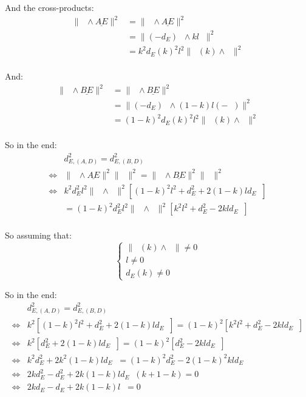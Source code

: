 \documentclass[10pt,a4paper]{article}
\newcommand{\ud}[1]{\underline{#1}}
\DeclareMathOperator{\cross}{\wedge}
\DeclareMathOperator{\AD}{\ud{AD}}
\DeclareMathOperator{\BD}{\ud{BD}}
\DeclareMathOperator{\ED}{\ud{ED}}
\DeclareMathOperator{\e}{\ud{e}}
\DeclareMathOperator{\n}{\ud{n}}
\DeclareMathOperator{\en}{\ud{e}\cdot\ud{n}}
\begin{document}
And the cross-products:
$$
\begin{array}{lll}
    \| \AD \cross \ud{AE} \|^2
    & = \| \ED \cross \ud{AE} \|^2\\
    & = \| (-d_E)\n \cross kl\e \|^2\\
    & = k^2d_E(k)^2l^2 \| \n(k) \cross \e \|^2\\
\end{array}
$$

And:
$$
\begin{array}{lll}
    \| \BD \cross \ud{BE} \|^2
    & = \| \ED \cross \ud{BE} \|^2\\
    & = \| (-d_E)\n \cross (1-k)l(-\e) \|^2\\
    & = (1-k)^2d_E(k)^2l^2 \| \n(k) \cross \e \|^2\\
\end{array}
$$

So in the end:
$$
\begin{array}{lll}
    & d_{E, (A,D)}^2 = d_{E, (B,D)}^2\\
    \Leftrightarrow &
    \| \AD \cross \ud{AE} \|^2 \| \BD \|^2
    = \| \BD \cross \ud{BE} \|^2 \| \AD \|^2\\
    \Leftrightarrow &
    k^2d_E^2l^2 \| \n \cross \e \|^2
    \left[ (1-k)^2l^2 + d_E^2 + 2 (1-k)ld_E \en \right]\\
    & = (1-k)^2d_E^2l^2 \| \n \cross \e \|^2
    \left[ k^2l^2 + d_E^2 - 2 kld_E \en \right]\\
\end{array}
$$

So assuming that:
$$
\left\{
    \begin{array}{ll}
        \| \n(k) \cross \e \| \neq 0\\
        l \neq 0\\
        d_E(k) \neq 0
    \end{array}
\right.
$$

So in the end:
$$
\begin{array}{lll}
    & d_{E, (A,D)}^2 = d_{E, (B,D)}^2\\
    \Leftrightarrow &
    k^2 \left[ (1-k)^2l^2 + d_E^2 + 2 (1-k)ld_E \en \right]
    = (1-k)^2 \left[ k^2l^2 + d_E^2 - 2 kld_E \en \right]\\
    \Leftrightarrow &
    k^2 \left[ d_E^2 + 2 (1-k)ld_E \en \right]
    = (1-k)^2 \left[ d_E^2 - 2 kld_E \en \right]\\
    \Leftrightarrow &
    k^2d_E^2 + 2 k^2(1-k)ld_E \en
    = (1-k)^2d_E^2 - 2(1-k)^2kld_E \en\\
    \Leftrightarrow &
    2kd_E^2 - d_E^2 + 2k(1-k)ld_E\en(k + 1 - k) = 0\\
    \Leftrightarrow &
    2kd_E - d_E + 2k(1-k)l\en = 0\\
\end{array}
$$
\end{document}
